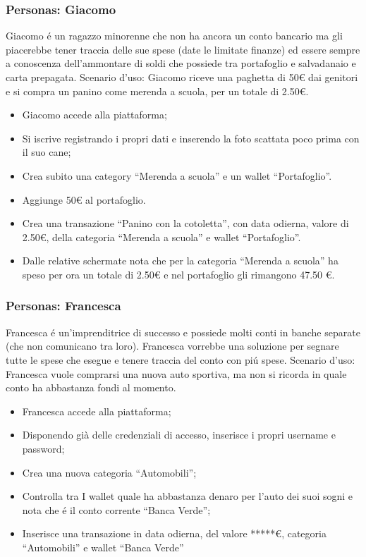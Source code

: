 \documentclass{report}
\begin{document}
\subsubsection{Personas: Giacomo}
Giacomo é un ragazzo minorenne che non ha ancora un conto bancario ma gli piacerebbe tener traccia delle sue spese (date le limitate finanze) ed essere sempre a conoscenza dell’ammontare di soldi che possiede tra portafoglio e salvadanaio e carta prepagata.
\newline \newline
Scenario d’uso: Giacomo riceve una paghetta di 50€ dai genitori e si compra un panino come merenda a scuola, per un totale di 2.50€.
\begin{itemize}
    \item Giacomo accede alla piattaforma;
    \item Si iscrive registrando i propri dati e inserendo la foto scattata poco prima con il suo cane;
    \item Crea subito una category “Merenda a scuola” e  un wallet “Portafoglio”.
    \item Aggiunge 50€ al portafoglio.
    \item Crea una transazione “Panino con la cotoletta”, con data odierna, valore di 2.50€, della categoria “Merenda a scuola” e wallet “Portafoglio”.
    \item Dalle relative schermate nota che per la categoria “Merenda a scuola” ha speso per ora un totale di 2.50€ e nel portafoglio gli rimangono 47.50 €.
\end{itemize}

\subsubsection{Personas: Francesca}
Francesca é un’imprenditrice di successo e possiede molti conti in banche separate (che non comunicano tra loro). Francesca vorrebbe una soluzione per segnare tutte le spese che esegue e tenere traccia del conto con piú spese.
\newline \newline
Scenario d’uso: Francesca vuole comprarsi una nuova auto sportiva, ma non si ricorda in quale conto ha abbastanza fondi al momento.
\begin{itemize}
    \item Francesca accede alla piattaforma;
    \item Disponendo già delle credenziali di accesso, inserisce i propri username e password;
    \item Crea una nuova categoria “Automobili”;
    \item Controlla tra I wallet quale ha abbastanza denaro per l’auto dei suoi sogni e nota che é il conto corrente “Banca Verde”;
    \item Inserisce una transazione in data odierna, del valore *****€, categoria “Automobili” e wallet “Banca Verde”
\end{itemize}
\end{document}
